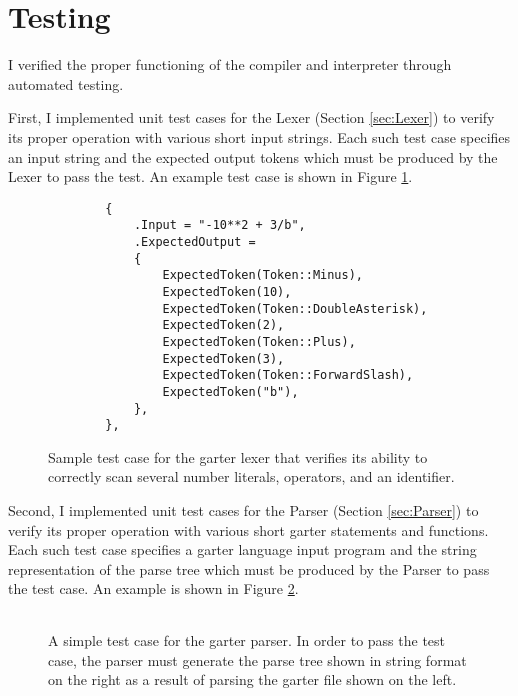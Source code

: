 \documentclass[11pt]{article}
\begin{document}
\section{Testing}

\label{sec:testing}

I verified the proper functioning of the compiler and interpreter through
automated testing.

First, I implemented unit test cases for the Lexer (Section \ref{sec:Lexer}) to
verify its proper operation with various short input strings.  Each such test
case specifies an input string and the expected output tokens which must be
produced by the Lexer to pass the test.  An example test case is shown in Figure
\ref{fig:TestLexer}.

\begin{figure}
    \lstset{language=C++}
    \begin{lstlisting}
        {
            .Input = "-10**2 + 3/b",
            .ExpectedOutput =
            {
                ExpectedToken(Token::Minus),
                ExpectedToken(10),
                ExpectedToken(Token::DoubleAsterisk),
                ExpectedToken(2),
                ExpectedToken(Token::Plus),
                ExpectedToken(3),
                ExpectedToken(Token::ForwardSlash),
                ExpectedToken("b"),
            },
        },
    \end{lstlisting}
    \caption{Sample test case for the garter lexer that verifies its ability to
        correctly scan several number literals, operators, and an identifier.}
    \label{fig:TestLexer}
\end{figure}

Second, I implemented unit test cases for the Parser (Section \ref{sec:Parser})
to verify its proper operation with various short garter statements and
functions.  Each such test case specifies a garter language input program and
the string representation of the parse tree which must be produced by the Parser
to pass the test case.  An example is shown in Figure \ref{fig:TestParser}.

\begin{figure}
    \begin{tabular}{|p{4cm}|p{11cm}|}
    \hline
    
    &
    
    \\ \hline
    \end{tabular}
    \caption{A simple test case for the garter parser.
        In order to pass the test case, the parser must generate the parse tree
        shown in string format on the right as a result of parsing the garter file
        shown on the left.  }
    \label{fig:TestParser}
\end{figure}
\end{document}
